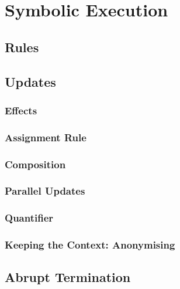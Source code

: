 \documentclass[a4paper, 11pt, accentcolor = tud3b]{tudreport}
\begin{document}
		\section{Symbolic Execution} %

			\subsection{Rules} %

			\subsection{Updates} %

				\subsubsection{Effects} %

				\subsubsection{Assignment Rule} %

				\subsubsection{Composition} %

				\subsubsection{Parallel Updates} %

				\subsubsection{Quantifier} %

				\subsubsection{Keeping the Context: Anonymising} %

			\subsection{Abrupt Termination} %
\end{document}
